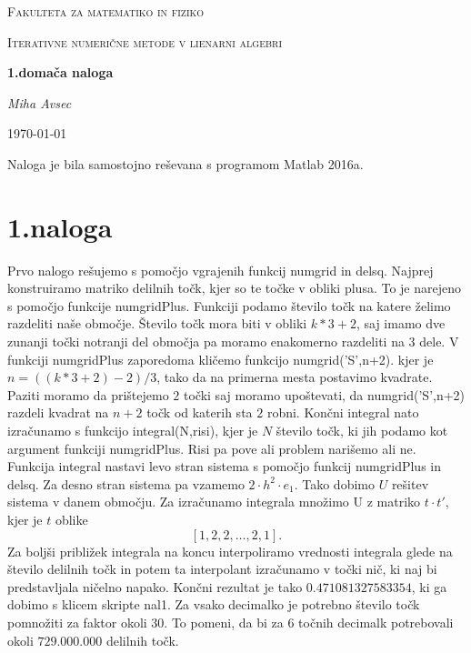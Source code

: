 \documentclass[11pt]{article} %
\begin{document}
\begin{titlepage}
\centering
{\scshape\LARGE Fakulteta za matematiko in fiziko \par}
\vspace{1cm}
{\scshape\Large Iterativne numerične metode v lienarni algebri\par}
\vspace{1.5cm}
{\huge\bfseries 1.domača naloga\par}
\vspace{2cm}
{\Large\itshape Miha Avsec\par}
\vfill

\vfill

{\large \today\par}
\end{titlepage}

Naloga je bila samostojno reševana s programom Matlab 2016a.

\section{1.naloga}

Prvo nalogo rešujemo s pomočjo vgrajenih funkcij numgrid in delsq. Najprej konstruiramo matriko delilnih točk, kjer so te točke v obliki plusa. To je narejeno s pomočjo funkcije numgridPlus.
Funkciji podamo število točk na katere želimo razdeliti naše območje. Število točk mora biti v obliki $k*3 +2$, saj imamo dve zunanji točki notranji del območja pa moramo enakomerno razdeliti na $3$ dele. V funkciji numgridPlus zaporedoma kličemo funkcijo numgrid('S',n+2). kjer je $n = ((k*3+2)-2)/3$, tako da na primerna mesta postavimo kvadrate. Paziti moramo da prištejemo $2$ točki saj moramo upoštevati, da numgrid('S',n+2) razdeli kvadrat na $n+2$ točk od katerih sta $2$ robni. Končni integral nato izračunamo s funkcijo integral(N,risi), kjer je $N$ število točk, ki jih podamo kot argument funkciji numgridPlus. Risi pa pove ali problem narišemo ali ne. Funkcija integral nastavi levo stran sistema s pomočjo funkcij numgridPlus in delsq. Za desno stran sistema pa vzamemo $2\cdot h^2 \cdot e_1$. Tako dobimo $U$ rešitev sistema v danem območju. Za izračunamo integrala množimo U z matriko $t\cdot t'$, kjer je $t$ oblike
$$[1,2,2, \ldots, 2,1].$$
Za boljši približek integrala na koncu interpoliramo vrednosti integrala glede na število delilnih točk in potem ta interpolant izračunamo v točki nič, ki naj bi predstavljala ničelno napako. Končni rezultat je tako $0.471081327583354$, ki ga dobimo s klicem skripte nal1. Za vsako decimalko je potrebno število točk pomnožiti za faktor okoli $30$. To pomeni, da bi za $6$ točnih decimalk potrebovali okoli $729.000.000$ delilnih točk.
\end{document}
